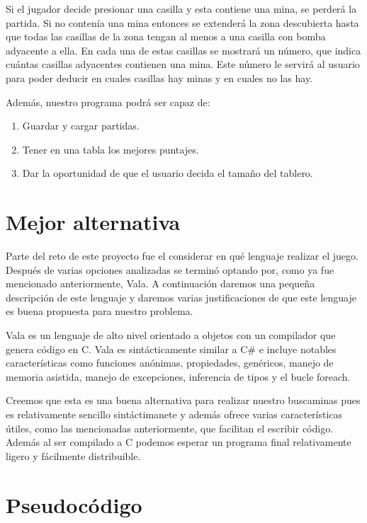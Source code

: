 \documentclass{article}
\begin{document}
	Si el jugador decide presionar una casilla y esta contiene una mina, se
	perderá la partida. Si no contenía una mina entonces se extenderá la zona
	descubierta hasta que todas las casillas de la zona tengan al menos a una
	casilla con bomba adyacente a ella. En cada una de estas casillas se
	mostrará un número, que indica cuántas casillas adyacentes contienen una
	mina. Este número le servirá al usuario para poder deducir en cuales
	casillas hay minas y en cuales no las hay.

	Además, nuestro programa podrá ser capaz de:

    \begin{enumerate}
        \item Guardar y cargar partidas.
        \item Tener en una tabla los mejores puntajes.
        \item Dar la oportunidad de que el usuario decida el tamaño del tablero.
    \end{enumerate}

    \section{Mejor alternativa}

	Parte del reto de este proyecto fue el considerar en qué lenguaje realizar
	el juego. Después de varias opciones analizadas se terminó optando por, como
	ya fue mencionado anteriormente, Vala. A continuación daremos una pequeña
	descripción de este lenguaje y daremos varias justificaciones de que este
	lenguaje es buena propuesta para nuestro problema.

	Vala es un lenguaje de alto nivel orientado a objetos con un compilador
	que genera código en C. Vala es sintácticamente similar a C\# e incluye
	notables características como funciones anónimas, propiedades, genéricos,
	manejo de memoria asistida, manejo de excepciones, inferencia de tipos y el
	bucle foreach.

	Creemos que esta es una buena alternativa para realizar nuestro buscaminas
	pues es relativamente sencillo sintáctimanete y además ofrece varias
	características útiles, como las mencionadas anteriormente, que facilitan el
	escribir código. Además al ser compilado a C podemos esperar un programa
	final relativamente ligero y fácilmente distribuible.

    \section{Pseudocódigo}
\end{document}
